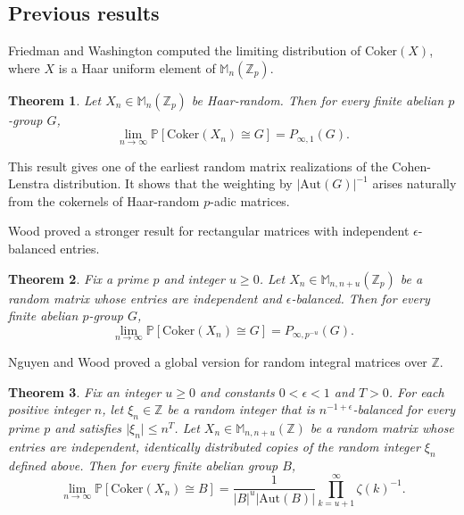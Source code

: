 \documentclass[12pt]{amsart}
\newtheorem{theorem}{Theorem}[section]
\theoremstyle{definition}
\newcommand{\PPP}{\mathbb{P}}
\newcommand{\abs}[1]{\vert#1\vert}
\newcommand{\im}{\text{Im}}
\newcommand{\Zp}{\Z_p}
\newcommand{\Z}{\mathbb{Z}}
\newcommand{\Coker}{\text{Coker}}
\newcommand{\Aut}{\text{Aut}}
\begin{document}
\subsection{Previous results}



Friedman and Washington \cite{friedman1989distribution} computed the limiting distribution of $\Coker(X)$, where $X$ is a Haar uniform element of $\mathbb{M}_n(\Zp)$.

\begin{theorem}\cite{friedman1989distribution}
Let $X_n \in \mathbb{M}_n(\Z_p)$ be Haar-random. Then for every finite abelian $p$-group $G$,
\[
\lim_{n\to\infty} \PPP[\Coker(X_n)\cong G] = P_{\infty,1}(G).
\]
\end{theorem}

This result gives one of the earliest random matrix realizations of the Cohen-Lenstra distribution. It shows that the weighting by $\abs{\Aut(G)}^{-1}$ arises naturally from the cokernels of Haar-random $p$-adic matrices.


Wood \cite{wood2019random} proved a stronger result for rectangular matrices with independent $\epsilon$-balanced entries.

\begin{theorem}\cite{wood2019random}\label{Thm: wood coker rectangle}
Fix a prime $p$ and integer $u\geq 0$. Let $X_n\in\mathbb{M}_{n,n+u}(\Zp)$ be a random matrix whose entries are independent and $\epsilon$-balanced.
Then for every finite abelian $p$-group $G$,
\[
\lim_{n\to\infty} 
\PPP[\Coker(X_n) \cong G] 
= P_{\infty,p^{-u}}(G).
\]
\end{theorem}



Nguyen and Wood \cite{nguyen2022random} proved a global version for random integral matrices over $\Z$.


\begin{theorem}\cite{nguyen2022random}
\label{Thm: Nguyen 1}
Fix an integer $u\ge 0$ and constants $0<\epsilon<1$ and $T>0$.
For each positive integer $n$, let $\xi_n\in\Z$ be a random integer that is $n^{-1+\epsilon}$-balanced for every prime $p$ and satisfies $\abs{\xi_n}\leq n^T$.
Let $X_n\in\mathbb{M}_{n,n+u}(\Z)$ be a random matrix whose entries are independent, identically distributed copies of the random integer $\xi_n$ defined above.
Then for every finite abelian group $B$,
\[
\lim_{n\to\infty} \PPP[\Coker(X_n)\cong B]
=
\frac{1}{\abs{B}^u \abs{\Aut(B)}}
\prod_{k=u+1}^{\infty}\zeta(k)^{-1}.
\]
\end{theorem}
\end{document}
